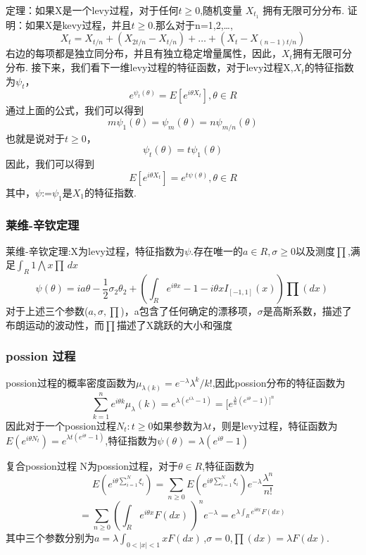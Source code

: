 \begin{frame}
定理：如果X是一个levy过程，对于任何$t \geq 0$,随机变量 $X_{t_1} $ 拥有无限可分分布.
证明：如果X是kevy过程，并且$t \geq 0$.那么对于n=1,2,\dots,\[ X_{t}=X_{t/n}+(X_{2t/n}-X_{t/n})+\dots+(X_{t}-X_{(n-1)t/n})\]右边的每项都是独立同分布，并且有独立稳定增量属性，因此，${X_{t}}$拥有无限可分分布.
接下来，我们看下一维levy过程的特征函数，对于levy过程X,$X_{t}$的特征指数为$\psi_{t}$，\[e^{\psi_{t}(\theta)}=E[e^{i \theta X_{t}}] ,\theta \in R \]通过上面的公式，我们可以得到\[ m\psi_{1}(\theta)=\psi_{m}(\theta)=n\psi_{m/n}(\theta)\] 也就是说对于$t \geq 0$，\[\psi_{t}(\theta)=t\psi_{1}(\theta)\]因此，我们可以得到\[E[e^{i\theta X_{t}}]=e^{t\psi(\theta)}, \theta \in R\]其中，$\psi$:=$\psi_{1}$是$X_{1}$的特征指数.

\end{frame}
\begin{frame}
\frametitle{莱维-辛钦定理}
莱维-辛钦定理:X为levy过程，特征指数为$\psi$.存在唯一的$a \in R,\sigma \geq 0$以及测度$\prod$,满足$\int_R 1 \bigwedge x \prod \,dx$  \[\psi(\theta)=ia\theta-\frac{1}{2}\sigma_{2}\theta_{2}+(\int_R e^{i\theta x}-1-i\theta xI_{[-1,1]}(x))\prod(dx) \, \]对于上述三个参数($a,\sigma,\prod$)，a包含了任何确定的漂移项，$\sigma$是高斯系数，描述了布朗运动的波动性，而$\prod$描述了X跳跃的大小和强度
\end{frame}

\begin{frame}
\frametitle{possion 过程}
possion过程的概率密度函数为$\mu_{\lambda({k})}=e^{-\lambda}\lambda^{k}/k!$,因此possion分布的特征函数为\[\sum_{k=1}^{n}e^{i\theta k}\mu_{\lambda}({k})=e^{\lambda(e^{i\lambda}-1)}=[e^{\frac{\lambda}{n}(e^{i\theta}-1)]^{n}} \]因此对于一个possion过程{$N_{t}:t \geq 0$}如果参数为$\lambda t$，则是levy过程，特征函数为$E(e^{i\theta N_{t}})=e^{\lambda t(e^{i\theta}-1)}$,特征指数为$\psi(\theta)=\lambda(e^{i\theta}-1)$
\end{frame}

\begin{frame}
复合possion过程\newline\newline
N为possion过程，对于$\theta \in R $,特征函数为\[E(e^{i\theta\sum_{i=1}^{N}\xi_{i}})=\sum_{n\geq0}E(e^{i\theta\sum_{i=1}^{N}\xi_{i}})e^{-\lambda}\frac{\lambda^{n}}{n!}\]
\newline
\[=\sum_{n\geq0}(\int_R e^{i\theta x}F(dx)\,)^{n}e^{-\lambda}=e^{\lambda\int_R e^{i\theta x}F(dx)\,} \]其中三个参数分别为$a=\lambda\int_{0<|x|<1}xF(dx) \,$,$\sigma=0$,$\prod(dx)=\lambda F(dx)$.

\end{frame}

